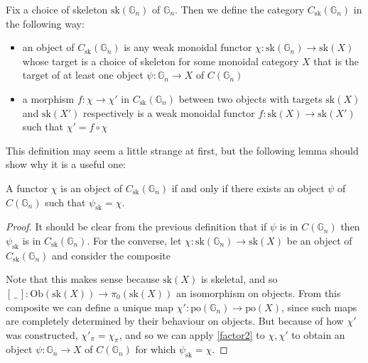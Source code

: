 \documentclass{amsart} %
\newenvironment{eq*}{\begin{equation*}}{\end{equation*}}
\begin{document}
\begin{defn} Fix a choice of skeleton $\mathrm{sk}(\mathbb{G}_n)$ of $\mathbb{G}_n$. Then we define the category $C_{\mathrm{sk}}(\mathbb{G}_n)$ in the following way:
\begin{itemize}
\item an object of $C_{\mathrm{sk}}(\mathbb{G}_n)$ is any weak monoidal functor $\chi: \mathrm{sk}(\mathbb{G}_n) \to \mathrm{sk}(X)$ whose target is a choice of skeleton for some monoidal category $X$ that is the target of at least one object $\psi: \mathbb{G}_n \to X$ of $C(\mathbb{G}_n)$
\item a morphism $f: \chi \to \chi'$ in $C_{\mathrm{sk}}(\mathbb{G}_n)$ between two objects with targets $\mathrm{sk}(X)$ and $\mathrm{sk}(X')$ respectively is a weak monoidal functor $f: \mathrm{sk}(X) \to \mathrm{sk}(X')$ such that $\chi' = f \circ \chi$
\end{itemize}
\end{defn}

This definition may seem a little strange at first, but the following lemma should show why it is a useful one:

\begin{lem}\label{Csklem} A functor $\chi$ is an object of $C_{\mathrm{sk}}(\mathbb{G}_n)$ if and only if there exists an object $\psi$ of $C(\mathbb{G}_n)$ such that $\psi_{\mathrm{sk}} = \chi$.
\end{lem}
\begin{proof}
It should be clear from the previous definition that if $\psi$ is in $C(\mathbb{G}_n)$ then $\psi_{\mathrm{sk}}$ is in $C_{\mathrm{sk}}(\mathbb{G}_n)$. For the converse, let $\chi: \mathrm{sk}(\mathbb{G}_n) \to \mathrm{sk}(X)$ be an object of $C_{\mathrm{sk}}(\mathbb{G}_n)$ and consider the composite
\begin{eq*}  \end{eq*}
Note that this makes sense because $\mathrm{sk}(X)$ is skeletal, and so $[ \, \_ \, ] : \mathrm{Ob}(\mathrm{sk}(X)) \to \pi_0(\mathrm{sk}(X))$ an isomorphism on objects. From this composite we can define a unique map $\chi': \mathrm{po}(\mathbb{G}_n) \to \mathrm{po}(X)$, since such maps are completely determined by their behaviour on objects. But because of how $\chi'$ was constructed, $\chi'_{\pi} = \chi_{\pi}$, and so we can apply \cref{factor2} to $\chi, \chi'$ to obtain an object $\psi : \mathbb{G}_n \to X$ of $C(\mathbb{G}_n)$ for which $\psi_{\mathrm{sk}} = \chi$.
\end{proof}
\end{document}
